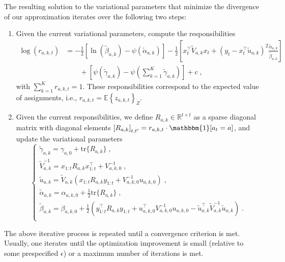 \documentclass{article}
\def \Real{{\mathbb R}}
\newcommand{\eValue}[1]{\mathbb{E}\left\{ #1 \right\}}
\newcommand{\ie}{i.e., }
\newcommand{\tr}{\mathrm{tr}}
\begin{document}
The resulting solution to the variational parameters that minimize the divergence of our approximation iterates over the following two steps:
\begin{enumerate}
	\item Given the current variational parameters, compute the responsibilities
		\begin{equation}
		\begin{split}
		\log (r_{a,k,t}) &= -\frac{1}{2} \left[\ln\left(\widetilde{\beta}_{a,k}\right) - \psi \left(\widetilde{\alpha}_{a,k}\right)\right] -\frac{1}{2} \left[x_t^\top \widetilde{V}_{a,k} x_t + (y_t-x_t^\top \widetilde{u}_{a,k})^2\frac{\widetilde{\alpha}_{a,k}}{\widetilde{\beta}_{a,k}}\right] \\
		& \qquad + \left[\psi(\widetilde{\gamma}_{a,k})- \psi\left(\sum_{k=1}^K\widetilde{\gamma}_{a,k}\right)\right] + c \;,
		\end{split}
		\end{equation}
		with $\sum_{k=1}^K r_{a,k,t} = 1$. These responsibilities correspond to the expected value of assignments, \ie $r_{a,k,t}=\eValue{z_{a,k,t}}_{Z}$.
	\item Given the current responsibilities, we define $R_{a,k}\in\Real^{t\times t}$ as a sparse diagonal matrix with diagonal elements $\left[R_{a,k}\right]_{t,t^\prime}=r_{a,k,t} \cdot \mathbbm{1}[a_t=a]$, and update the variational parameters
		\begin{equation}
		\begin{cases}
		\widetilde{\gamma}_{a,k}=\gamma_{a,0} + \tr\{R_{a,k}\} \;, \\
		\widetilde{V}_{a,k}^{-1} = x_{1:t} R_{a,k} x_{1:t}^\top + V_{a,k,0}^{-1} \;,\\
		\widetilde{u}_{a,k}= \widetilde{V}_{a,k} \left( x_{1:t} R_{a,k} y_{1:t} + V_{a,k,0}^{-1} u_{a,k,0}\right) \;, \\
		\widetilde{\alpha}_{a,k} = \alpha_{a,k,0} + \frac{1}{2} \tr\{R_{a,k}\} \;, \\
		\widetilde{\beta}_{a,k} = \beta_{a,k,0} + \frac{1}{2}\left(y_{1:t}^\top R_{a,k}y_{1:t} + u_{a,k,0}^\top V_{a,k,0}^{-1} u_{a,k,0} - \widetilde{u}_{a,k}^\top \widetilde{V}_{a,k}^{-1} \widetilde{u}_{a,k} \right) \; .\\
		\end{cases}
		\end{equation}
\end{enumerate}

The above iterative process is repeated until a convergence criterion is met. Usually, one iterates until the optimization improvement is small (relative to some prespecified $\epsilon$) or a maximum number of iterations is met.
\end{document}
